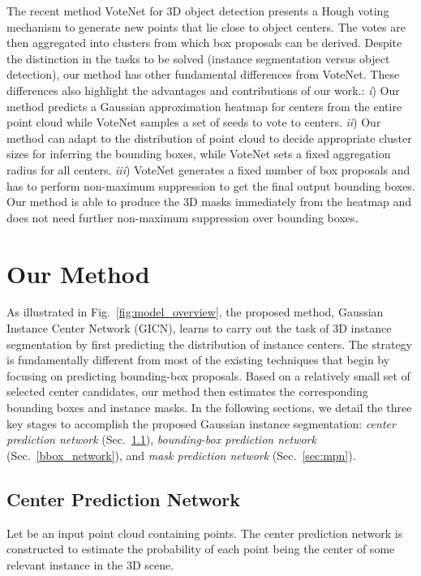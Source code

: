 \documentclass[runningheads]{llncs}
\begin{document}
The recent method VoteNet \cite{QiLHG19} for 3D object detection presents a Hough voting mechanism to generate new points that lie close to object centers. The votes are then aggregated into clusters from which box proposals can be derived. Despite the distinction in the tasks to be solved (instance segmentation versus object detection), our method has other fundamental differences from VoteNet. These differences also highlight the advantages and contributions of our work.: {\em i}) Our method predicts a Gaussian approximation heatmap for centers from the entire point cloud while VoteNet samples a set of seeds to vote to centers. {\em ii}) Our method can adapt to the distribution of point cloud to decide appropriate cluster sizes for inferring the bounding boxes, while VoteNet sets a fixed aggregation radius for all centers. {\em iii}) VoteNet generates a fixed number of box proposals and has to perform non-maximum suppression to get the final output bounding boxes. Our method is able to produce the 3D masks immediately from the heatmap and does not need further non-maximum suppression over bounding boxes. 



\section{Our Method}
As illustrated in Fig.~\ref{fig:model_overview}, the proposed method, Gaussian Instance Center Network (GICN), learns to carry out the task of 3D instance segmentation by first predicting the distribution of instance centers. The strategy is fundamentally different from most of the existing techniques that begin by focusing on predicting bounding-box proposals. Based on a relatively small set of selected center candidates, our method then estimates the corresponding bounding boxes and instance masks. In the following sections, we detail the three key stages to accomplish the proposed Gaussian instance segmentation: {\em center prediction network} (Sec.~\ref{sec:cpn}), {\em bounding-box prediction network} (Sec.~\ref{bbox_network}), and {\em mask prediction network} (Sec.~\ref{sec:mpn}).




\subsection{Center Prediction Network }
\label{sec:cpn}
Let  be an input point cloud containing  points. The center prediction network  is constructed to estimate the probability of each point  being the center of some relevant instance in the 3D scene. 
\end{document}
